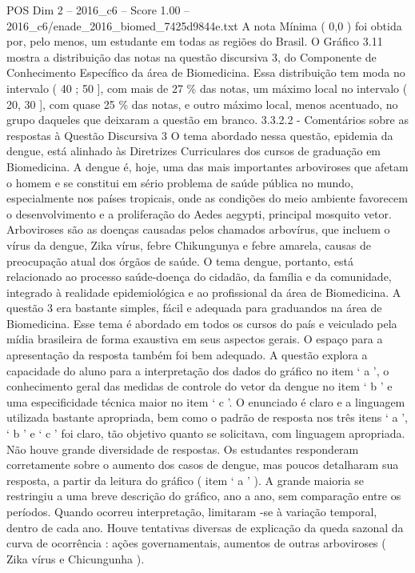 \begin{textsample}{POS Dim 2 – 2016\_c6 – Score 1.00 – 2016\_c6/enade\_2016\_biomed\_7425d9844e.txt}
A nota Mínima ( 0,0 ) foi obtida por, pelo menos, um estudante em todas as regiões do Brasil.
O Gráfico 3.11 mostra a distribuição das notas na questão discursiva 3, do Componente de Conhecimento Específico da área de Biomedicina.
Essa distribuição tem moda no intervalo ( 40 ; 50 ], com mais de 27 \% das notas, um máximo local no intervalo ( 20, 30 ], com quase 25 \% das notas, e outro máximo local, menos acentuado, no grupo daqueles que deixaram a questão em branco. 3.3.2.2 - Comentários sobre as respostas à Questão Discursiva 3 O tema abordado nessa questão, epidemia da dengue, está alinhado às Diretrizes Curriculares dos cursos de graduação em Biomedicina.
A dengue é, hoje, uma das mais importantes arboviroses que afetam o homem e se constitui em sério problema de saúde pública no mundo, especialmente nos países tropicais, onde as condições do meio ambiente favorecem o desenvolvimento e a proliferação do Aedes aegypti, principal mosquito vetor.
Arboviroses são as doenças causadas pelos chamados arbovírus, que incluem o vírus da dengue, Zika vírus, febre Chikungunya e febre amarela, causas de preocupação atual dos órgãos de saúde.
O tema dengue, portanto, está relacionado ao processo saúde-doença do cidadão, da família e da comunidade, integrado à realidade epidemiológica e ao profissional da área de Biomedicina.
A questão 3 era bastante simples, fácil e adequada para graduandos na área de Biomedicina.
Esse tema é abordado em todos os cursos do país e veiculado pela mídia brasileira de forma exaustiva em seus aspectos gerais.
O espaço para a apresentação da resposta também foi bem adequado.
A questão explora a capacidade do aluno para a interpretação dos dados do gráfico no item ‘ a ’, o conhecimento geral das medidas de controle do vetor da dengue no item ‘ b ’ e uma especificidade técnica maior no item ‘ c ’.
O enunciado é claro e a linguagem utilizada bastante apropriada, bem como o padrão de resposta nos três itens ‘ a ’, ‘ b ’ e ‘ c ’ foi claro, tão objetivo quanto se solicitava, com linguagem apropriada.
Não houve grande diversidade de respostas.
Os estudantes responderam corretamente sobre o aumento dos casos de dengue, mas poucos detalharam sua resposta, a partir da leitura do gráfico ( item ‘ a ’ ).
A grande maioria se restringiu a uma breve descrição do gráfico, ano a ano, sem comparação entre os períodos.
Quando ocorreu interpretação, limitaram -se à variação temporal, dentro de cada ano.
Houve tentativas diversas de explicação da queda sazonal da curva de ocorrência : ações governamentais, aumentos de outras arboviroses ( Zika vírus e Chicungunha ).

\end{textsample}
